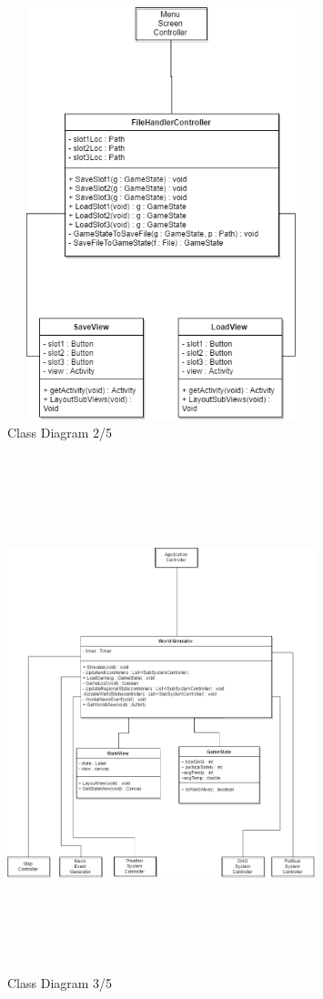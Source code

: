 \documentclass[]{article}
\begin{document}
\pagebreak
\begin{figure}[h]
    \centering
    \includegraphics[width=0.8\textwidth , height=12cm, keepaspectratio]{dcdF}
    \caption{Class Diagram 2/5}
    \label{fig:dcdTL}
\end{figure}

\pagebreak
\begin{figure}[h]
    \centering
    \includegraphics[width=0.8\textwidth , height=15cm, keepaspectratio]{dcdWS}
    \caption{Class Diagram 3/5}
    \label{fig:dcdTL}
\end{figure}
\end{document}
